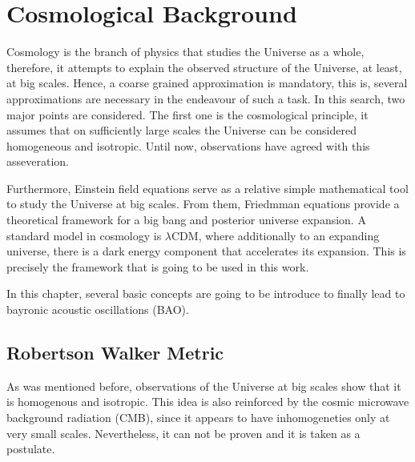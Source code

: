 \chapter{ Cosmological Background }\label{chap:marco}

Cosmology is the branch of physics that studies the Universe as a whole, 
therefore, it attempts to explain the observed structure of the Universe,
at least, at big scales. Hence, a coarse grained approximation is mandatory, 
this is, several approximations are necessary in the endeavour of such a task.
In this search, two major points are considered. The first one is the 
cosmological principle, it assumes that on sufficiently large scales the Universe can 
be considered homogeneous and isotropic. Until now, observations have agreed
with this asseveration. 

Furthermore, Einstein field equations serve as a relative simple mathematical tool to 
study the Universe at big scales. From them, Friedmman equations provide a theoretical 
framework for a big bang and posterior universe expansion. A standard model in cosmology
is $\lambda$CDM, where additionally to an expanding universe, there is a dark energy 
component that accelerates its expansion. This is precisely the framework that is going to 
be used in this work. 

In this chapter, several basic concepts are going to be introduce to finally lead to 
bayronic acoustic oscillations (BAO). 

\section{ Robertson Walker Metric}

As was mentioned before, observations of the Universe at big scales show 
that it is homogenous and isotropic. This idea is also reinforced by the cosmic 
microwave background radiation (CMB), since it appears to have inhomogeneties
only at very small scales. Nevertheless, it can not be proven and it is taken
as a postulate. 


